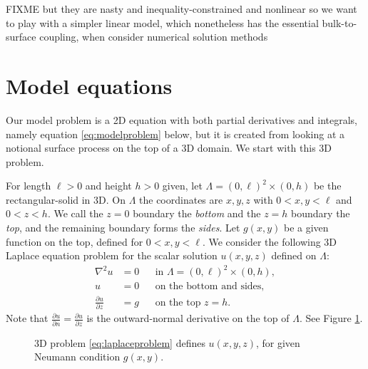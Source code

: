 \documentclass[letterpaper,final,12pt,reqno]{amsart}
\theoremstyle{cstyle}
\theoremstyle{cstyle*}
\theoremstyle{dstyle}
\newcommand{\grad}{\nabla}
\begin{document}
FIXME but they are nasty and inequality-constrained and nonlinear so we want to play with a simpler linear model, which nonetheless has the essential bulk-to-surface coupling, when consider numerical solution methods

\section{Model equations} \label{sec:model}

Our model problem is a 2D equation with both partial derivatives and integrals, namely equation \eqref{eq:modelproblem} below, but it is created from looking at a notional surface process on the top of a 3D domain.  We start with this 3D problem.

For length $\ell>0$ and height $h>0$ given, let $\Lambda = (0,\ell)^2\times (0,h)$ be the rectangular-solid in 3D.  On $\Lambda$ the coordinates are $x,y,z$ with $0<x,y<\ell$ and $0<z<h$.  We call the $z=0$ boundary the \emph{bottom} and the $z=h$ boundary the \emph{top}, and the remaining boundary forms the \emph{sides}.  Let $g(x,y)$ be a given function on the top, defined for $0<x,y<\ell$.  We consider the following 3D Laplace equation problem for the scalar solution $u(x,y,z)$ defined on $\Lambda$:
\begin{subequations}
\label{eq:laplaceproblem}
\begin{align}
\grad^2 u &= 0 & &\text{in } \Lambda = (0,\ell)^2\times (0,h), \label{eq:laplaceproblemA} \\
u &= 0 & &\text{on the bottom and sides}, \label{eq:laplaceproblemB} \\
\frac{\partial u}{\partial z} &= g & &\text{on the top $z=h$}. \label{eq:laplaceproblemC}
\end{align}
\end{subequations}
Note that $\frac{\partial u}{\partial n}=\frac{\partial u}{\partial z}$ is the outward-normal derivative on the top of $\Lambda$.  See Figure \ref{fig:laplaceproblem}.

\begin{figure}[ht]
\caption{3D problem \eqref{eq:laplaceproblem} defines $u(x,y,z)$, for given Neumann condition $g(x,y)$.}
\label{fig:laplaceproblem}
\end{figure}
\end{document}
